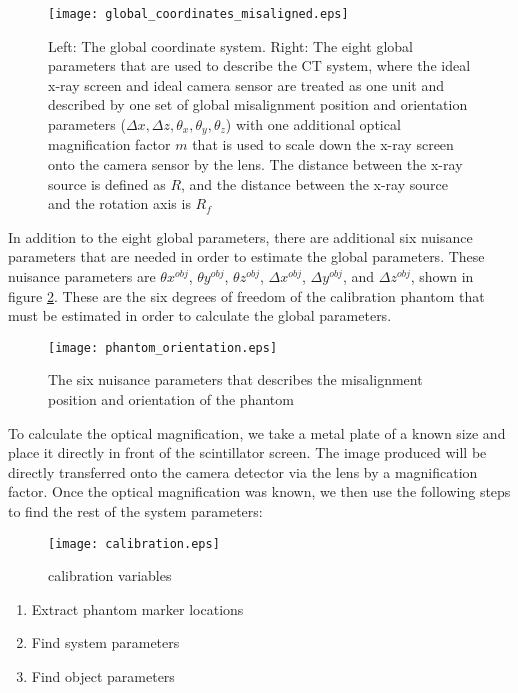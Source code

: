 \begin{figure}[ht]
\centering
\texttt{[image: global\_coordinates\_misaligned.eps]}
\label{fig:global_coord_misaligned}
\caption{Left: The global coordinate system.  Right: The eight global parameters that are used to describe the CT system, where the ideal x-ray screen and ideal camera sensor are treated as one unit and described by one set of global misalignment position and orientation parameters ($\Delta x, \Delta z, \theta_x, \theta_y, \theta_z$) with one additional optical magnification factor $m$ that is used to scale down the x-ray screen onto the camera sensor by the lens.  The distance between the x-ray source is defined as $R$, and the distance between the x-ray source and the rotation axis is $R_f$}
\end{figure}

In addition to the eight global parameters, there are additional six nuisance parameters that are needed in order to estimate the global parameters.  These nuisance parameters are $\theta x^{obj}$, $\theta y^{obj}$, $\theta z^{obj}$, $\Delta x^{obj}$, $\Delta y^{obj}$, and $\Delta z^{obj}$, shown in figure \ref{fig:phantom_orientation}.  These are the six degrees of freedom of the calibration phantom that must be estimated in order to calculate the global parameters.  

\begin{figure}[ht]
\centering
\texttt{[image: phantom\_orientation.eps]}
\caption{The six nuisance parameters that describes the misalignment position and orientation of the phantom}
\label{fig:phantom_orientation}
\end{figure}


To calculate the optical magnification, we take a metal plate of a known size and place it directly in front of the scintillator screen.  The image produced will be directly transferred onto the camera detector via the lens by a magnification factor.  Once the optical magnification was known, we then use the following steps to find the rest of the system parameters:

\begin{figure}[ht]
\centering
\texttt{[image: calibration.eps]}
\caption{calibration variables}
\label{fig:calibration}
\end{figure}


\begin{enumerate}
\item Extract phantom marker locations
\item Find system parameters
\item Find object parameters
\end{enumerate}

